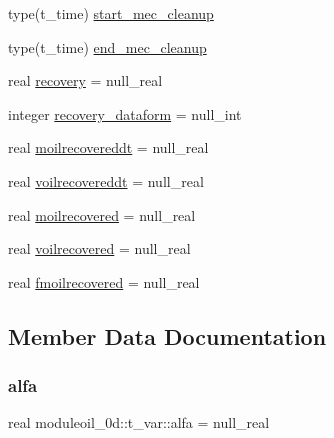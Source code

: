 \begin{DoxyCompactItemize}
\item 
type(t\+\_\+time) \mbox{\hyperlink{structmoduleoil__0d_1_1t__var_a999bd79a338a67ef521fcfb554403c7e}{start\+\_\+mec\+\_\+cleanup}}
\item 
type(t\+\_\+time) \mbox{\hyperlink{structmoduleoil__0d_1_1t__var_a35aa556dfc466ca28a7869e333516755}{end\+\_\+mec\+\_\+cleanup}}
\item 
real \mbox{\hyperlink{structmoduleoil__0d_1_1t__var_adbcdf9c68c78597e028a294598711c80}{recovery}} = null\+\_\+real
\item 
integer \mbox{\hyperlink{structmoduleoil__0d_1_1t__var_a50c5ada59fe50cd5417853d5f31ec7bf}{recovery\+\_\+dataform}} = null\+\_\+int
\item 
real \mbox{\hyperlink{structmoduleoil__0d_1_1t__var_abc541f1a17e1b2c546aca41ba8d6966d}{moilrecovereddt}} = null\+\_\+real
\item 
real \mbox{\hyperlink{structmoduleoil__0d_1_1t__var_a7d2555c727437eaf7537c769d499f5b1}{voilrecovereddt}} = null\+\_\+real
\item 
real \mbox{\hyperlink{structmoduleoil__0d_1_1t__var_a3a26b52e050c368e46bed67f7f5b7939}{moilrecovered}} = null\+\_\+real
\item 
real \mbox{\hyperlink{structmoduleoil__0d_1_1t__var_a4b7861a7e16c124e6be39044e5b158bb}{voilrecovered}} = null\+\_\+real
\item 
real \mbox{\hyperlink{structmoduleoil__0d_1_1t__var_a5a2936613b7c28a68e91b822db7d1365}{fmoilrecovered}} = null\+\_\+real
\end{DoxyCompactItemize}


\subsection{Member Data Documentation}
\mbox{\label{structmoduleoil__0d_1_1t__var_acf71159f121382ae5067270d90aaf10c}} 
\subsubsection{\texorpdfstring{alfa}{alfa}}
{\footnotesize\ttfamily real moduleoil\+\_\+0d\+::t\+\_\+var\+::alfa = null\+\_\+real\hspace{0.3cm}{\ttfamily [private]}}

\mbox{\label{structmoduleoil__0d_1_1t__var_a37ef93d8b59b55aaa5930acc576fe68f}} 
